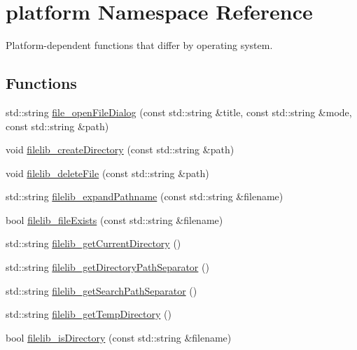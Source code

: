 \hypertarget{namespaceplatform}{}\section{platform Namespace Reference}
\label{namespaceplatform}


Platform-\/dependent functions that differ by operating system.  


\subsection*{Functions}
\begin{DoxyCompactItemize}
\item 
std\+::string \mbox{\hyperlink{namespaceplatform_aa812fb80e0cb15f75d35975ea91e8f2b}{file\+\_\+open\+File\+Dialog}} (const std\+::string \&title, const std\+::string \&mode, const std\+::string \&path)
\item 
void \mbox{\hyperlink{namespaceplatform_aa30655cd42c277a7c5ed7aba21cf0050}{filelib\+\_\+create\+Directory}} (const std\+::string \&path)
\item 
void \mbox{\hyperlink{namespaceplatform_a50db655854102498e7bbc1d5f409a29f}{filelib\+\_\+delete\+File}} (const std\+::string \&path)
\item 
std\+::string \mbox{\hyperlink{namespaceplatform_a7aec69b6d9120eefca74eeba8f7eb02d}{filelib\+\_\+expand\+Pathname}} (const std\+::string \&filename)
\item 
bool \mbox{\hyperlink{namespaceplatform_a7ac56ce70edb176e3d75d83732517d85}{filelib\+\_\+file\+Exists}} (const std\+::string \&filename)
\item 
std\+::string \mbox{\hyperlink{namespaceplatform_a52fd33354355f61a96ea88ac33aaa11a}{filelib\+\_\+get\+Current\+Directory}} ()
\item 
std\+::string \mbox{\hyperlink{namespaceplatform_abf9418d14665b0404fd9a942cd890151}{filelib\+\_\+get\+Directory\+Path\+Separator}} ()
\item 
std\+::string \mbox{\hyperlink{namespaceplatform_a9641200cba6781202640c6b723341af2}{filelib\+\_\+get\+Search\+Path\+Separator}} ()
\item 
std\+::string \mbox{\hyperlink{namespaceplatform_a969c5e3fc13cd635656eba2845bc932e}{filelib\+\_\+get\+Temp\+Directory}} ()
\item 
bool \mbox{\hyperlink{namespaceplatform_a68319ac7586223f385d7785f1b38e1b9}{filelib\+\_\+is\+Directory}} (const std\+::string \&filename)
\item 

\end{DoxyCompactItemize}
